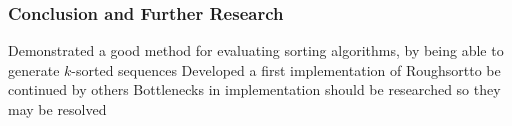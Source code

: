 \documentclass[10pt, xcolor={dvipsnames}, aspectratio=169]{beamer}
\begin{document}
\begin{frame}
\frametitle{Conclusion and Further Research}
Demonstrated a good method for evaluating sorting algorithms, by being able to generate $k$-sorted sequences
\newline\newline
Developed a first implementation of Roughsort\textemdash to be continued by others
\newline\newline
Bottlenecks in implementation should be researched so they may be resolved
\end{frame}
\end{document}
